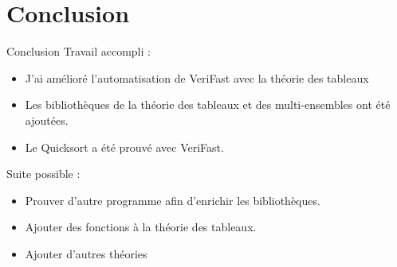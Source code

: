 \documentclass[]{beamer}
\newcommand{\verifast}{VeriFast}
\begin{document}
\section{Conclusion}

\begin{frame}
\tableofcontents[currentsection]
\end{frame}

\begin{frame}{Conclusion}
Travail accompli :
\begin{itemize}
\item J'ai am\'elior\'e l'automatisation de \verifast{} avec la th\'eorie des tableaux
\item Les biblioth\`eques de la th\'eorie des tableaux et des multi-ensembles ont \'et\'e ajout\'ees.
\item Le Quicksort a \'et\'e prouv\'e avec \verifast.
\end{itemize}

Suite possible :
\begin{itemize}
\item Prouver d'autre programme afin d'enrichir les biblioth\`eques.
\item Ajouter des fonctions \`a la th\'eorie des tableaux.
\item Ajouter d'autres th\'eories
\end{itemize}
\end{frame}
\end{document}
